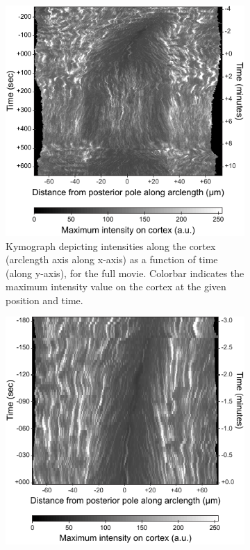 \begin{figure}[h]
\centering

\begin{subfigure}[t]{0.45\textwidth}
    \centering
    \includegraphics[width=\textwidth]{ExpMethods/FigCrtxFlows/kymographFullMovie.pdf}
    \caption{Kymograph depicting intensities along the cortex (arclength axis along x-axis) as a function of time (along y-axis), for the full movie. Colorbar indicates the maximum intensity value on the cortex at the given position and time.} 
    \label{subfig:crtxFlowMeasurement-kymographFullMovie}
\end{subfigure}
\hfill
\begin{subfigure}[t]{0.45\textwidth}
    \centering
    \includegraphics[width=\textwidth]{ExpMethods/FigCrtxFlows/kymographPosteriorization.pdf}

\end{subfigure}
\end{figure}
